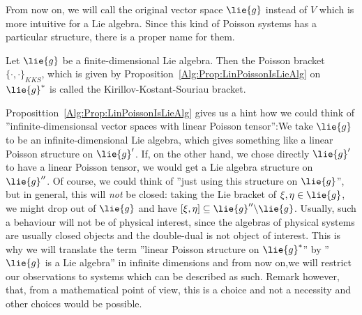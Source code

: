 From now on, we will call the original vector space $\lie{g}$ instead of 
$V$ which is more intuitive for a Lie algebra. Since this kind of Poisson 
systems has a particular structure, there is a proper name for them.
\begin{definition}
	\label{Def:KKS}
	Let $\lie{g}$ be a finite-dimensional Lie algebra. Then the Poisson 
	bracket $\{ \cdot , \cdot \}_{KKS}$, which is given by 
	Proposition~\ref{Alg:Prop:LinPoissonIsLieAlg} on $\lie{g}^*$ is called 
	the Kirillov-Kostant-Souriau bracket.
\end{definition}



Proposittion~\ref{Alg:Prop:LinPoissonIsLieAlg} gives us a hint how we could
think of ''infinite-dimensionsal vector spaces with linear Poisson 
tensor'':We take $\lie{g}$ to be an infinite-dimensional Lie algebra, which 
gives something like a linear Poisson structure on $\lie{g}'$.
If, on the other hand, we chose directly $\lie{g}'$ to have a linear
Poisson tensor, we would get a Lie algebra structure on $\lie{g}''$.
Of course, we could think of ''just using this structure on $\lie{g}$'',
but in general, this will \emph{not} be closed: taking the Lie bracket of
$\xi, \eta \in \lie{g}$, we might drop out of $\lie{g}$ and have
$[\xi, \eta] \subseteq \lie{g}'' \backslash \lie{g}$. Usually, such
a behaviour will not be of physical interest, since the algebras of 
physical systems are usually closed objects and the double-dual is
not object of interest. This is why we will translate  the term
''linear Poisson structure on $\lie{g}^*$'' by  ''$\lie{g}$ is a Lie 
algebra'' in infinite dimensions and  from now on,we will restrict our 
observations to systems which can be described as such. Remark however, 
that, from a mathematical point of view, this is a choice and not a 
necessity and other choices would be possible.


